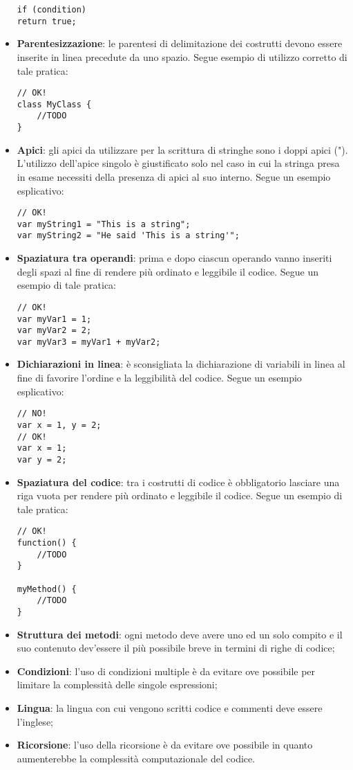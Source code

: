 \begin{itemize}
\begin{lstlisting}
if (condition)
return true;
\end{lstlisting}
	\item \textbf{Parentesizzazione}: le parentesi di delimitazione dei costrutti devono essere inserite in linea precedute da uno spazio. Segue esempio di utilizzo corretto di tale pratica:
\begin{lstlisting}
// OK!
class MyClass {
	//TODO
}
\end{lstlisting}
	\item \textbf{Apici}: gli apici da utilizzare per la scrittura di stringhe sono i doppi apici ("). L'utilizzo dell'apice singolo è giustificato solo nel caso in cui la stringa presa in esame necessiti della presenza di apici al suo interno. Segue un esempio esplicativo:
\begin{lstlisting}
// OK!
var myString1 = "This is a string";
var myString2 = "He said 'This is a string'";
\end{lstlisting}
	\item \textbf{Spaziatura tra operandi}: prima e dopo ciascun operando vanno inseriti degli spazi al fine di rendere più ordinato e leggibile il codice. Segue un esempio di tale pratica:
\begin{lstlisting}
// OK!
var myVar1 = 1;
var myVar2 = 2;
var myVar3 = myVar1 + myVar2;
\end{lstlisting}
	\item \textbf{Dichiarazioni in linea}: è sconsigliata la dichiarazione di variabili in linea al fine di favorire l'ordine e la leggibilità del codice. Segue un esempio esplicativo:
\begin{lstlisting}
// NO!
var x = 1, y = 2;
// OK!
var x = 1;
var y = 2;
\end{lstlisting}
	\item \textbf{Spaziatura del codice}: tra i costrutti di codice è obbligatorio lasciare una riga vuota per rendere più ordinato e leggibile il codice. Segue un esempio di tale pratica:
\begin{lstlisting}
// OK!
function() {
	//TODO
}

myMethod() {
	//TODO
}
\end{lstlisting}
	\item \textbf{Struttura dei metodi}: ogni metodo deve avere uno ed un solo compito e il suo contenuto dev'essere il più possibile breve in termini di righe di codice;
	\item \textbf{Condizioni}: l'uso di condizioni multiple è da evitare ove possibile per limitare la complessità delle singole espressioni;
	\item \textbf{Lingua}: la lingua con cui vengono scritti codice e commenti deve essere l'inglese;
	\item \textbf{Ricorsione}: l'uso della ricorsione è da evitare ove possibile in quanto aumenterebbe la complessità computazionale del codice.
\end{itemize}
